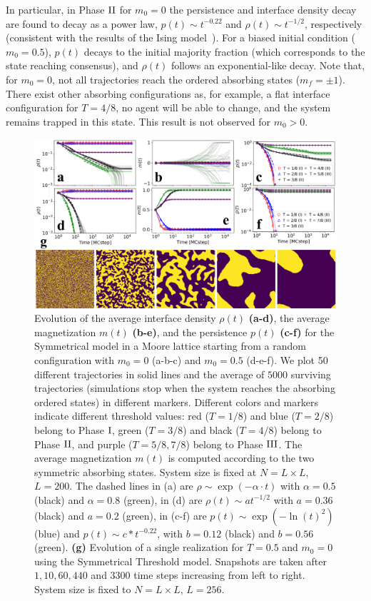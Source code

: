 In particular, in Phase ${\rm II}$ for $m_0 = 0$ the persistence and interface density decay are found to decay as a power law, $p(t) \sim t^{-0.22}$ and $\rho(t) \sim t^{-1/2}$, respectively (consistent with the results of the Ising model~\cite{stauffer-1994,derrida-1995A,derrida-1995B,derrida-1997}). For a biased initial condition ($m_0 = 0.5$), $p(t)$ decays to the initial majority fraction (which corresponds to the state reaching consensus), and $\rho(t)$ follows an exponential-like decay. Note that, for $m_0 = 0$, not all trajectories reach the ordered absorbing states ($m_f=\pm 1$). There exist other absorbing configurations as, for example,  a flat interface configuration for $T = 4/8$, no agent will be able to change, and the system remains trapped in this state. This result is not observed for $m_0 > 0$.
\begin{figure}[ht]
		\centering \captionsetup{font=sf}
		\includegraphics[width=\linewidth]{Figs/Aging_STM/FIG10_THESIS.pdf}
		\caption[Dynamical regimes in a Moore lattice.]{\label{fig:evolution_lattice} Evolution of the average interface density $\rho(t)$ \textbf{(a-d)}, the average magnetization $m(t)$ \textbf{(b-e)}, and the persistence $p(t)$ \textbf{(c-f)} for the Symmetrical model in a Moore lattice starting from a random configuration with $m_0 = 0$ (a-b-c) and $m_0 = 0.5$ (d-e-f). We plot 50 different trajectories in solid lines and the average of $5000$ surviving trajectories (simulations stop when the system reaches the absorbing ordered states) in different markers. Different colors and markers indicate different threshold values: red ($T = 1/8$) and blue ($T = 2/8$) belong to Phase ${\rm I}$, green ($T = 3/8$) and black ($T=4/8$) belong to Phase ${\rm II}$, and purple ($T = 5/8, 7/8$) belong to Phase ${\rm III}$. The average magnetization $m(t)$ is computed according to the two symmetric absorbing states. System size is fixed at $N = L \times L$, $L = 200$. The dashed lines in (a) are $\rho \sim \exp(-\alpha \cdot t)$ with $\alpha = 0.5$ (black) and $\alpha = 0.8$ (green), in (d) are $\rho(t) \sim at^{-1/2}$ with $a = 0.36$ (black) and $a = 0.2$ (green), in (c-f) are $p(t) \sim \exp(- \ln(t)^2)$ (blue) and $p(t) \sim c*t^{-0.22}$, with $b = 0.12$ (black) and $b = 0.56$ (green). \textbf{(g)} Evolution of a single realization for $T = 0.5$ and $m_0 = 0$ using the Symmetrical Threshold model. Snapshots are taken after $1,10,60,440$ and $3300$ time steps increasing from left to right. System size is fixed to $N = L \times L$, $L = 256$.
}
\end{figure}
